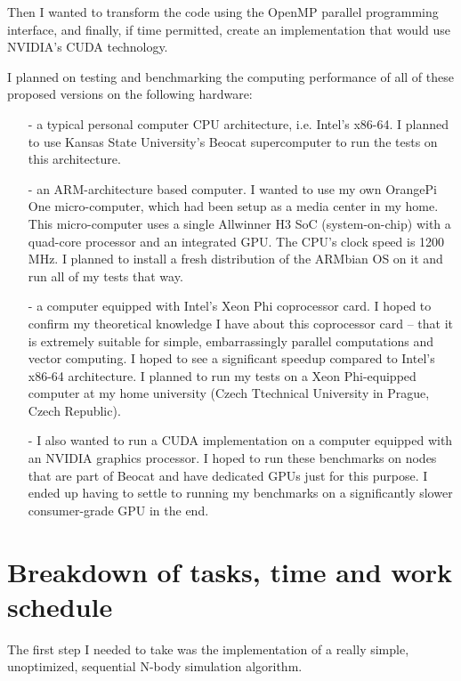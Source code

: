 \documentclass[journal]{IEEEtran}
\begin{document}
		Then I wanted to transform the code using the OpenMP parallel programming interface, and finally, if time permitted, create an implementation that would use NVIDIA's CUDA technology.
		
		I planned on testing and benchmarking the computing performance of all of these proposed versions on the following hardware:
		\begin{itemize}  
			\item[-]{a typical personal computer CPU architecture, i.e. Intel’s x86-64. I planned to use Kansas State University’s Beocat supercomputer to run the tests on this architecture.}
			
			\item[-]{an ARM-architecture based computer. I wanted to use my own OrangePi One micro-computer, which had been  setup as a media center in my home. This micro-computer uses a single Allwinner H3 SoC (system-on-chip) with a quad-core processor and an integrated GPU. The CPU's clock speed is 1200 MHz. I planned to install a fresh distribution of the ARMbian OS on it and run all of my tests that way.}
			
			\item[-]{a computer equipped with Intel’s Xeon Phi coprocessor card. I hoped to confirm my theoretical knowledge I have about this coprocessor card – that it is extremely suitable for simple, embarrassingly parallel computations and vector computing. I hoped to see a significant speedup compared to Intel’s x86-64 architecture. I planned to run my tests on a Xeon Phi-equipped computer at my home university (Czech Ttechnical University in Prague, Czech Republic).}
			
			\item[-]{I also wanted to run a CUDA implementation on a computer equipped with an NVIDIA graphics processor. I hoped to run these benchmarks on nodes that are part of Beocat and have dedicated GPUs just for this purpose. I ended up having to settle to running my benchmarks on a significantly slower consumer-grade GPU in the end.}
		\end{itemize}
	
	\section{Breakdown of tasks, time and work schedule}
	
		The first step I needed to take was the implementation of a really simple, unoptimized, sequential N-body simulation algorithm. 
		
\end{document}
